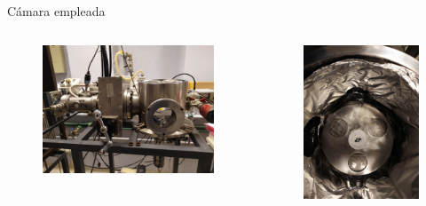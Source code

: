 \documentclass[11pt]{beamer}
\begin{document}
		\begin{frame}{Cámara empleada}
			\begin{columns}[T]
				\begin{column}{.49\textwidth}
					\begin{figure}[H]
					\centering
					\includegraphics[scale=0.04]{img/camara.jpg}
					\end{figure}
				\end{column}
				\begin{column}{.49\textwidth}
					\begin{figure}[H]
					\includegraphics[scale=0.04]{img/muestras.jpg}

\end{figure}
\end{column}
\end{columns}
\end{frame}
\end{document}
